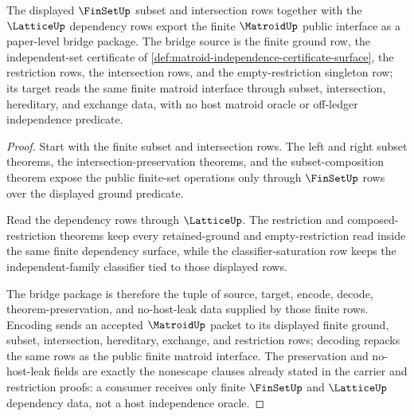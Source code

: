 \begin{theorem}
\label{thm:matroid-finite-bridge-package}
The displayed $\FinSetUp$ subset and intersection rows together with the $\LatticeUp$ dependency rows export the finite $\MatroidUp$ public interface as a paper-level bridge package. The bridge source is the finite ground row, the independent-set certificate of \autoref{def:matroid-independence-certificate-surface}, the restriction rows, the intersection rows, and the empty-restriction singleton row; its target reads the same finite matroid interface through subset, intersection, hereditary, and exchange data, with no host matroid oracle or off-ledger independence predicate.
\end{theorem}
\begin{proof}
Start with the finite subset and intersection rows. The left and right subset theorems, the intersection-preservation theorems, and the subset-composition theorem expose the public finite-set operations only through $\FinSetUp$ rows over the displayed ground predicate.

Read the dependency rows through $\LatticeUp$. The restriction and composed-restriction theorems keep every retained-ground and empty-restriction read inside the same finite dependency surface, while the classifier-saturation row keeps the independent-family classifier tied to those displayed rows.

The bridge package is therefore the tuple of source, target, encode, decode, theorem-preservation, and no-host-leak data supplied by those finite rows. Encoding sends an accepted $\MatroidUp$ packet to its displayed finite ground, subset, intersection, hereditary, exchange, and restriction rows; decoding repacks the same rows as the public finite matroid interface. The preservation and no-host-leak fields are exactly the nonescape clauses already stated in the carrier and restriction proofs: a consumer receives only finite $\FinSetUp$ and $\LatticeUp$ dependency data, not a host independence oracle.
\end{proof}

